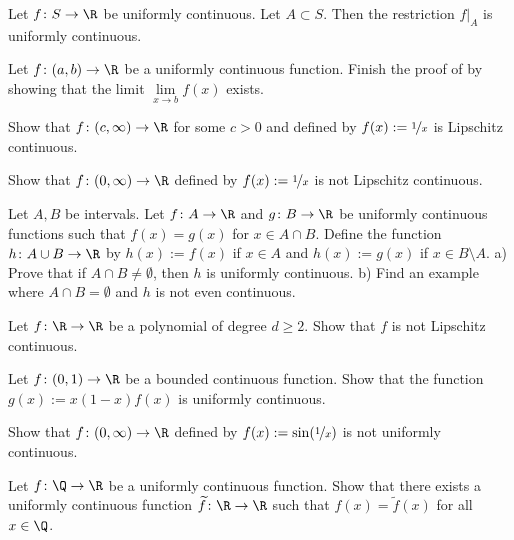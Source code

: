 \documentclass[12pt]{book}
\begin{document}
\begin{exercise}
Let $f \colon S \to \R$ be uniformly continuous.
Let $A \subset S$.
Then the restriction $f|_A$ is uniformly continuous.
\end{exercise}

\begin{exercise}
Let $f \colon (a,b) \to \R$ be a uniformly continuous function.
Finish the proof of  by showing that
the limit
$\lim\limits_{x \to b} f(x)$
exists.
\end{exercise}

\begin{exercise}
Show that $f \colon (c,\infty) \to \R$ for some $c > 0$
and defined by $f(x) := \nicefrac{1}{x}$ is Lipschitz continuous.
\end{exercise}

\begin{exercise}
Show that $f \colon (0,\infty) \to \R$
defined by $f(x) := \nicefrac{1}{x}$ is not Lipschitz continuous.
\end{exercise}

\begin{exercise}
Let $A, B$ be intervals.
Let $f \colon A \to \R$ and $g \colon B \to \R$ be uniformly continuous
functions such that $f(x) = g(x)$ for $x \in A \cap B$.
Define
the function $h \colon A \cup B \to \R$ by $h(x) := f(x)$ if
$x \in A$ and $h(x) := g(x)$ if $x \in B \setminus A$.
a) Prove that if $A \cap B \not= \emptyset$, then $h$ is uniformly continuous.
b) Find an example where $A \cap B = \emptyset$ and $h$ is not even
continuous.
\end{exercise}

\begin{exercise}[Challenging]
Let $f \colon \R \to \R$ be a polynomial of degree 
$d \geq 2$.
Show that $f$ is not Lipschitz
continuous.
\end{exercise}

\begin{exercise}
Let $f \colon (0,1) \to \R$ be a bounded continuous function.
Show that
the function
$g(x) := x(1-x)f(x)$ is uniformly continuous.
\end{exercise}

\begin{exercise}
Show that $f \colon (0,\infty) \to \R$ defined by $f(x) := \sin
(\nicefrac{1}{x})$ is not uniformly continuous.
\end{exercise}

\begin{exercise}[Challenging]
Let $f \colon \Q \to \R$ be a uniformly continuous function.
Show that
there exists a uniformly continuous function $\widetilde{f} \colon \R \to \R$
such that $f(x) = \widetilde{f}(x)$ for all $x \in \Q$.
\end{exercise}
\end{document}
